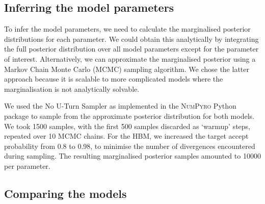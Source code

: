 \subsection{Inferring the model parameters}

To infer the model parameters, we need to calculate the marginalised posterior distributions for each parameter. We could obtain this analytically by integrating the full posterior distribution over all model parameters except for the parameter of interest. Alternatively, we can approximate the marginalised posterior using a Markov Chain Monte Carlo (MCMC) sampling algorithm. We chose the latter approach because it is scalable to more complicated models where the marginalisation is not analytically solvable.

We used the No U-Turn Sampler \citep[NUTS;][]{Hoffman.Gelman2014} as implemented in the \textsc{NumPyro} Python package \citep{Phan.Pradhan.ea2019,Bingham.Chen.ea2019} to sample from the approximate posterior distribution for both models. We took 1500 samples, with the first 500 samples discarded as `warmup' steps, repeated over 10 MCMC chains. For the HBM, we increased the target accept probability from 0.8 to 0.98, to minimise the number of divergences encountered during sampling. The resulting marginalised posterior samples amounted to \num{10000} per parameter.

\subsection{Comparing the models}

